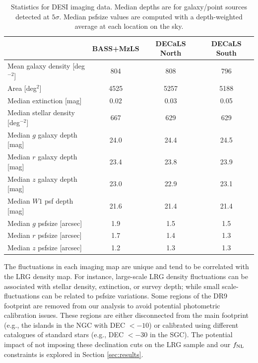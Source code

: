 \begin{table}
\caption{Statistics for DESI imaging data. Median depths are for galaxy/point sources detected at $5\sigma$. Median psfsize values are computed with a depth-weighted average at each location on the sky.}
\begin{center}
\begin{tabular}{lccc}
\hline
\hline
    & BASS+MzLS & DECaLS North & DECaLS South \\
\hline
\hline
Mean galaxy density [deg$^{-2}$]     & 804  & 808  & 796 \\
Area [deg$^2$]                       & 4525 & 5257 & 5188 \\
Median extinction [mag]              & 0.02 & 0.03 & 0.05\\
Median stellar density [deg$^{-2}$]  & 667  & 629  & 629\\
Median $g$ galaxy depth [mag]        & 24.0 & 24.4 & 24.5 \\
Median $r$ galaxy depth [mag]        & 23.4 & 23.8 & 23.9\\
Median $z$ galaxy depth [mag]        & 23.0 & 22.9 & 23.1\\
Median $W1$ psf depth [mag]          & 21.6 & 21.4 & 21.4\\
Median $g$ psfsize [arcsec]          & 1.9  & 1.5  & 1.5\\
Median $r$ psfsize [arcsec]          & 1.7  & 1.4  & 1.3\\
Median $z$ psfsize [arcsec]          & 1.2  & 1.3  & 1.3\\
\hline
\end{tabular}
\end{center}
\label{tab:imaging}
\end{table} 

The fluctuations in each imaging map are unique and tend to be correlated with the LRG density map. For instance, large-scale LRG density fluctuations can be associated with stellar density, extinction, or survey depth; while small scale-fluctuations can be related to psfsize variations. Some regions of the DR9 footprint are removed from our analysis to avoid potential photometric calibration issues. These regions are either disconnected from the main footprint (e.g., the islands in the NGC with DEC $<-10$) or calibrated using different catalogues of standard stars (e.g., DEC $<-30$ in the SGC). The potential impact of not imposing these declination cuts on the LRG sample and our $f_{\rm NL}$ constraints is explored in Section \ref{sec:results}. 

